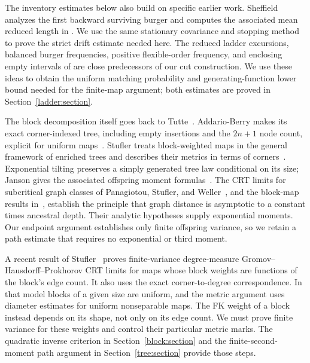 The inventory estimates below also build on specific earlier work.
Sheffield analyzes the first backward surviving burger and computes
the associated mean reduced length in
\cite[Section~3.1, Lemma~3.1]{Sheffield2016}. We use the same stationary
covariance and stopping method to prove the strict drift estimate
needed here. The reduced ladder excursions, balanced burger frequencies,
positive flexible-order frequency, and enclosing empty intervals of
\cite[Section~3.3]{Sheffield2016} are close predecessors of our cut
construction. We use these ideas to obtain the uniform matching
probability and generating-function lower bound needed for the
finite-map argument; both estimates are proved in
Section~\ref{ladder:section}.

The block decomposition itself goes back to
Tutte~\cite[Section~6]{Tutte1963}. Addario-Berry makes its exact
corner-indexed tree, including empty insertions and the $2n+1$ node
count, explicit for uniform maps~\cite[Section~2 and Proposition~3.1]{AddarioBerry2019}.
Stufler treats block-weighted maps in the general framework of enriched
trees and describes their metrics in terms of
corners~\cite[preprint Sections~6.1.5 and~6.8.3]{Stufler2020}.
Exponential tilting preserves a simply generated tree law conditional
on its size; Janson gives the associated offspring moment
formulas~\cite[Section~4]{Janson2012}.
The CRT limits for subcritical graph classes of Panagiotou, Stufler,
and Weller~\cite{PanagiotouStuflerWeller2016}, and the block-map results
in~\cite[preprint Theorems~6.60 and~6.62]{Stufler2020}, establish the principle
that graph distance is asymptotic to a constant times ancestral depth.
Their analytic hypotheses supply exponential moments. Our endpoint
argument establishes only finite offspring variance, so we retain a
path estimate that requires no exponential or third moment.

A recent result of Stufler~\cite[Theorem~1.2 and Lemma~9.1]{Stufler2026}
proves finite-variance degree-measure Gromov--Hausdorff--Prokhorov CRT
limits for maps whose block weights are functions of the block's edge
count. It also uses the exact corner-to-degree correspondence. In that
model blocks of a given size are uniform, and the metric argument uses
diameter estimates for uniform nonseparable maps. The FK weight of a
block instead depends on its shape, not only on its edge count. We must
prove finite variance for these weights and control their particular
metric marks.
The quadratic inverse criterion in Section~\ref{block:section} and the
finite-second-moment path argument in Section~\ref{tree:section}
provide those steps.

